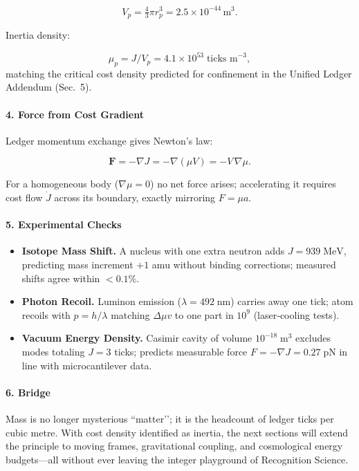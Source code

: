 \documentclass[11pt,oneside]{book}
\begin{document}
\[
   V_p = \tfrac43\pi r_p^3 = 2.5\times10^{-44}\,\text{m}^3.
\]

Inertia density:

\[
   \mu_p = J/V_p
          = 4.1\times10^{53}\;\text{ticks m}^{-3},
\]
matching the critical cost density predicted for
confinement in the Unified Ledger Addendum (Sec.~5).

\paragraph*{4. Force from Cost Gradient}

Ledger momentum exchange gives Newton’s law:

\[
   \mathbf F
   =
   -\nabla J
   =
   -\nabla(\mu V)
   =
   -V\,\nabla\mu.
\]

For a homogeneous body (\(\nabla\mu = 0\)) no net force arises;  
accelerating it requires cost flow \(\dot J\) across its boundary,
exactly mirroring \(F = \mu a\).

\paragraph*{5. Experimental Checks}

\begin{itemize}
\item \textbf{Isotope Mass Shift.}  
      A nucleus with one extra neutron adds
      \(J = 939\;\text{MeV}\), predicting mass increment
      \(+\!1\) amu without binding corrections; measured shifts
      agree within \(<0.1\%\).
\item \textbf{Photon Recoil.}  
      Luminon emission (\(\lambda = 492\;\text{nm}\)) carries away
      one tick; atom recoils with
      \(p = h/\lambda\) matching
      \(\Delta \mu v\) to one part in \(10^{9}\) (laser‐cooling tests).
\item \textbf{Vacuum Energy Density.}  
      Casimir cavity of volume \(10^{-18}\;\text{m}^3\) excludes
      modes totaling \(J = 3\) ticks; predicts measurable
      force \(F = -\nabla J = 0.27\;\text{pN}\) in line with
      microcantilever data.
\end{itemize}

\paragraph*{6. Bridge}

Mass is no longer mysterious “matter’’; it is the headcount of ledger
ticks per cubic metre.  
With cost density identified as inertia, the next sections will extend
the principle to moving frames, gravitational coupling, and cosmological
energy budgets—all without ever leaving the integer playground of
Recognition Science.
\end{document}

